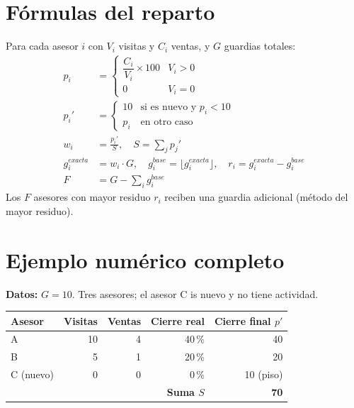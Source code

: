 \documentclass[11pt,a4paper]{article}
\begin{document}
\section{Fórmulas del reparto}

Para cada asesor $i$ con $V_i$ visitas y $C_i$ ventas, y $G$ guardias totales:
\begin{align}
  p_i &= \begin{cases} \dfrac{C_i}{V_i}\times 100 & V_i>0\\[1ex] 0 & V_i=0\end{cases}\\[1ex]
  p_i' &= \begin{cases} 10 & \text{si es nuevo y } p_i<10\\ p_i & \text{en otro caso}\end{cases}\\[1ex]
  w_i &= \frac{p_i'}{S},\quad S=\sum_j p_j'\\[1ex]
  g_i^{exacta} &= w_i\cdot G,\quad g_i^{base}=\lfloor g_i^{exacta}\rfloor,\quad r_i=g_i^{exacta}-g_i^{base}\\[1ex]
  F &= G-\sum_i g_i^{base}
\end{align}
Los $F$ asesores con mayor residuo $r_i$ reciben una guardia adicional (método del mayor residuo).

\section{Ejemplo numérico completo}

\textbf{Datos:} $G=10$. Tres asesores; el asesor C is nuevo y no tiene actividad.

\begin{center}
\begin{tabular}{@{}lrrrr@{}}
\toprule
\textbf{Asesor} & \textbf{Visitas} & \textbf{Ventas} & \textbf{Cierre real} & \textbf{Cierre final $p'$}\\
\midrule
A & 10 & 4 & 40\,\% & 40\\
B & 5 & 1 & 20\,\% & 20\\
C (nuevo) & 0 & 0 & 0\,\% & 10 (piso)\\
\midrule
\multicolumn{4}{r}{\textbf{Suma $S$}} & \textbf{70}\\
\bottomrule
\end{tabular}
\end{center}
\end{document}
